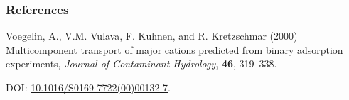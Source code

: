 \documentclass{beamer}
\begin{document}
\begin{frame}\frametitle{References}

\small
Voegelin, A., V.M. Vulava, F. Kuhnen, and R. Kretzschmar (2000)
Multicomponent transport of major cations predicted from binary adsorption
experiments, \textit{Journal of Contaminant Hydrology}, \textbf{46}, 319--338.

\medskip
DOI: \href{https://doi.org/10.1016/S0169-7722(00)00132-7}{10.1016/S0169-7722(00)00132-7}.

\end{frame}
\end{document}
